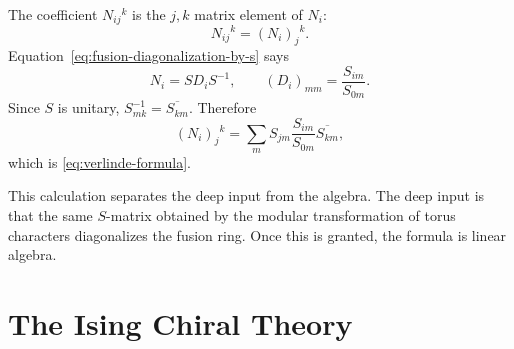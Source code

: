 The coefficient \(N_{ij}{}^k\) is the \(j,k\) matrix element of \(N_i\):
\[
  N_{ij}{}^k=(N_i)_j{}^k.
\]
Equation~\eqref{eq:fusion-diagonalization-by-s} says
\[
  N_i
  =
  S D_i S^{-1},
  \qquad
  (D_i)_{mm}=\frac{S_{im}}{S_{0m}}.
\]
Since \(S\) is unitary, \(S^{-1}_{mk}=\overline{S_{km}}\).  Therefore
\[
  (N_i)_j{}^k
  =
  \sum_m S_{jm}\frac{S_{im}}{S_{0m}}\overline{S_{km}},
\]
which is \eqref{eq:verlinde-formula}.

This calculation separates the deep input from the algebra.  The deep input is
that the same \(S\)-matrix obtained by the modular transformation of torus
characters diagonalizes the fusion ring.  Once this is granted, the formula is
linear algebra.

\section{The Ising Chiral Theory}
\label{sec:ising-chiral-theory}

